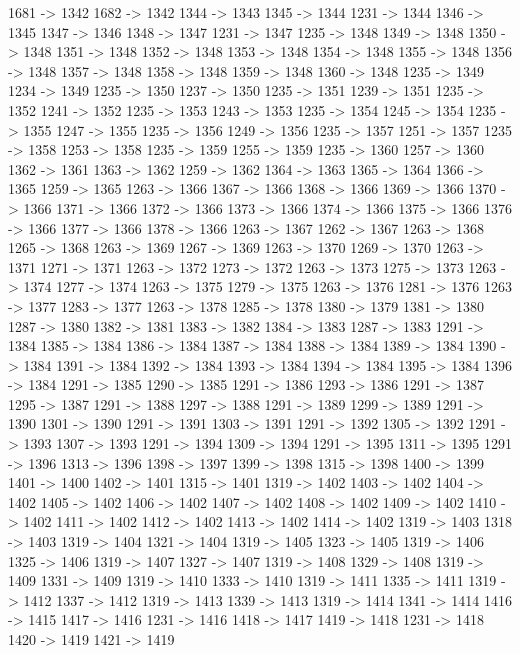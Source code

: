 {	1681 -> 1342
	1682 -> 1342
	1344 -> 1343
	1345 -> 1344
	1231 -> 1344
	1346 -> 1345
	1347 -> 1346
	1348 -> 1347
	1231 -> 1347
	1235 -> 1348
	1349 -> 1348
	1350 -> 1348
	1351 -> 1348
	1352 -> 1348
	1353 -> 1348
	1354 -> 1348
	1355 -> 1348
	1356 -> 1348
	1357 -> 1348
	1358 -> 1348
	1359 -> 1348
	1360 -> 1348
	1235 -> 1349
	1234 -> 1349
	1235 -> 1350
	1237 -> 1350
	1235 -> 1351
	1239 -> 1351
	1235 -> 1352
	1241 -> 1352
	1235 -> 1353
	1243 -> 1353
	1235 -> 1354
	1245 -> 1354
	1235 -> 1355
	1247 -> 1355
	1235 -> 1356
	1249 -> 1356
	1235 -> 1357
	1251 -> 1357
	1235 -> 1358
	1253 -> 1358
	1235 -> 1359
	1255 -> 1359
	1235 -> 1360
	1257 -> 1360
	1362 -> 1361
	1363 -> 1362
	1259 -> 1362
	1364 -> 1363
	1365 -> 1364
	1366 -> 1365
	1259 -> 1365
	1263 -> 1366
	1367 -> 1366
	1368 -> 1366
	1369 -> 1366
	1370 -> 1366
	1371 -> 1366
	1372 -> 1366
	1373 -> 1366
	1374 -> 1366
	1375 -> 1366
	1376 -> 1366
	1377 -> 1366
	1378 -> 1366
	1263 -> 1367
	1262 -> 1367
	1263 -> 1368
	1265 -> 1368
	1263 -> 1369
	1267 -> 1369
	1263 -> 1370
	1269 -> 1370
	1263 -> 1371
	1271 -> 1371
	1263 -> 1372
	1273 -> 1372
	1263 -> 1373
	1275 -> 1373
	1263 -> 1374
	1277 -> 1374
	1263 -> 1375
	1279 -> 1375
	1263 -> 1376
	1281 -> 1376
	1263 -> 1377
	1283 -> 1377
	1263 -> 1378
	1285 -> 1378
	1380 -> 1379
	1381 -> 1380
	1287 -> 1380
	1382 -> 1381
	1383 -> 1382
	1384 -> 1383
	1287 -> 1383
	1291 -> 1384
	1385 -> 1384
	1386 -> 1384
	1387 -> 1384
	1388 -> 1384
	1389 -> 1384
	1390 -> 1384
	1391 -> 1384
	1392 -> 1384
	1393 -> 1384
	1394 -> 1384
	1395 -> 1384
	1396 -> 1384
	1291 -> 1385
	1290 -> 1385
	1291 -> 1386
	1293 -> 1386
	1291 -> 1387
	1295 -> 1387
	1291 -> 1388
	1297 -> 1388
	1291 -> 1389
	1299 -> 1389
	1291 -> 1390
	1301 -> 1390
	1291 -> 1391
	1303 -> 1391
	1291 -> 1392
	1305 -> 1392
	1291 -> 1393
	1307 -> 1393
	1291 -> 1394
	1309 -> 1394
	1291 -> 1395
	1311 -> 1395
	1291 -> 1396
	1313 -> 1396
	1398 -> 1397
	1399 -> 1398
	1315 -> 1398
	1400 -> 1399
	1401 -> 1400
	1402 -> 1401
	1315 -> 1401
	1319 -> 1402
	1403 -> 1402
	1404 -> 1402
	1405 -> 1402
	1406 -> 1402
	1407 -> 1402
	1408 -> 1402
	1409 -> 1402
	1410 -> 1402
	1411 -> 1402
	1412 -> 1402
	1413 -> 1402
	1414 -> 1402
	1319 -> 1403
	1318 -> 1403
	1319 -> 1404
	1321 -> 1404
	1319 -> 1405
	1323 -> 1405
	1319 -> 1406
	1325 -> 1406
	1319 -> 1407
	1327 -> 1407
	1319 -> 1408
	1329 -> 1408
	1319 -> 1409
	1331 -> 1409
	1319 -> 1410
	1333 -> 1410
	1319 -> 1411
	1335 -> 1411
	1319 -> 1412
	1337 -> 1412
	1319 -> 1413
	1339 -> 1413
	1319 -> 1414
	1341 -> 1414
	1416 -> 1415
	1417 -> 1416
	1231 -> 1416
	1418 -> 1417
	1419 -> 1418
	1231 -> 1418
	1420 -> 1419
	1421 -> 1419
}
